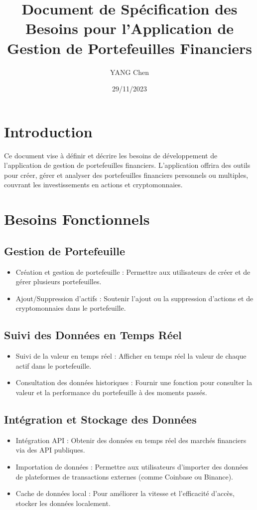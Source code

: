 \documentclass{article}
\title{Document de Spécification des Besoins pour l'Application de Gestion de Portefeuilles Financiers}
\date{29/11/2023}
\author{YANG Chen}
\begin{document}
\maketitle

\section{Introduction}
Ce document vise à définir et décrire les besoins de développement de l'application de gestion de portefeuilles financiers. L'application offrira des outils pour créer, gérer et analyser des portefeuilles financiers personnels ou multiples, couvrant les investissements en actions et cryptomonnaies.

\section{Besoins Fonctionnels}
\subsection{Gestion de Portefeuille}
\begin{itemize}
    \item Création et gestion de portefeuille : Permettre aux utilisateurs de créer et de gérer plusieurs portefeuilles.
    \item Ajout/Suppression d'actifs : Soutenir l'ajout ou la suppression d'actions et de cryptomonnaies dans le portefeuille.
\end{itemize}

\subsection{Suivi des Données en Temps Réel}
\begin{itemize}
    \item Suivi de la valeur en temps réel : Afficher en temps réel la valeur de chaque actif dans le portefeuille.
    \item Consultation des données historiques : Fournir une fonction pour consulter la valeur et la performance du portefeuille à des moments passés.
\end{itemize}

\subsection{Intégration et Stockage des Données}
\begin{itemize}
    \item Intégration API : Obtenir des données en temps réel des marchés financiers via des API publiques.
    \item Importation de données : Permettre aux utilisateurs d'importer des données de plateformes de transactions externes (comme Coinbase ou Binance).
    \item Cache de données local : Pour améliorer la vitesse et l'efficacité d'accès, stocker les données localement.
\end{itemize}
\end{document}
